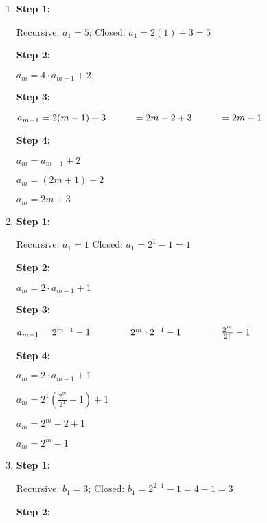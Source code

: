 \begin{enumerate}
        \item
            \textbf{Step 1:}
            
            Recursive: $a_{1} = 5$; \tab
            Closed: $a_{1} = 2(1) + 3 = 5$
            \tab \checkmark
            
            \textbf{Step 2:}
            
            $a_{m} = 4 \cdot a_{m-1} + 2$

            \textbf{Step 3:}
            
            $ a_{m-1} = 2(m-1) + 3 \hspace*{1cm}{}
            = 2m - 2 + 3 \hspace*{1cm}{}
            = 2m + 1
            $

            \textbf{Step 4:}
            
            $ a_{m} = a_{m-1} + 2 $

            $ a_{m} = (2m+1) + 2 $

            $ a_{m} = 2m + 3 $

        \item
            \textbf{Step 1:}
            
            Recursive:
            $ a_{1} = 1 $
            \tab
            Closed:
            $ a_{1} = 2^{1} - 1  = 1$
            \tab \checkmark
            
            \textbf{Step 2:}
            
            $ a_{m} = 2 \cdot a_{m-1} + 1 $

            \textbf{Step 3:}
            
            $ a_{m-1} = 2^{m-1} - 1
            \hspace*{1cm}{}
            = 2^{m} \cdot 2^{-1} - 1
            \hspace*{1cm}{}
            = \frac{2^{m}}{2^{1}} - 1
            $

            \textbf{Step 4:}
            
            $ a_{m} = 2 \cdot a_{m-1} + 1 $
            
            $ a_{m} = 2^{1}(\frac{2^{m}}{2^{1}} - 1) + 1 $

            $ a_{m} = 2^{m} - 2 + 1 $

            $ a_{m} = 2^{m} - 1 $

        \item
            \textbf{Step 1:}
            
            Recursive: $b_{1} = 3$; \tab
            Closed: $b_{1} = 2^{2\cdot1} - 1 = 4 - 1 = 3$ \tab \checkmark
            
            \textbf{Step 2:}
            

\end{enumerate}

